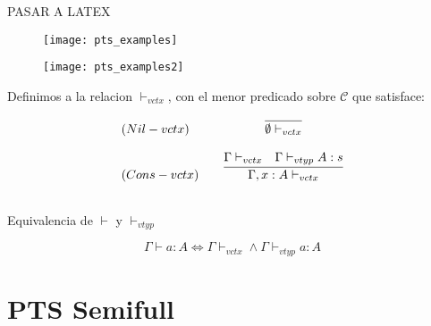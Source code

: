 PASAR A LATEX

\begin{figure}[h]
\centering
\texttt{[image: pts\_examples]}
\end{figure}

\begin{figure}[h]
\centering
\texttt{[image: pts\_examples2]}
\end{figure}

\begin{definition}
Definimos a la relacion $\vdash_{vctx}$, con el menor predicado sobre $\mathcal{C}$ que satisface:

\[
\begin{array}{llcr}
	(Nil-vctx)  & &\infer{\emptyset \vdash_{vctx}}{} \\ \\ 
	(Cons-vctx) & &\infer{\Gamma, x:A \vdash_{vctx}}{\Gamma \vdash_{vctx} & \Gamma \vdash_{vtyp} A : s} \\ \\ 
	

	
\end{array}
\]

\begin{lemma}{Equivalencia de $\vdash$ y $\vdash_{vtyp}$}

\begin{equation}
\Gamma \vdash a : A \Leftrightarrow \Gamma \vdash_{vctx} \land \Gamma \vdash_{vtyp} a:A
\end{equation}
\end{lemma}

\end{definition}


\section{PTS Semifull}

